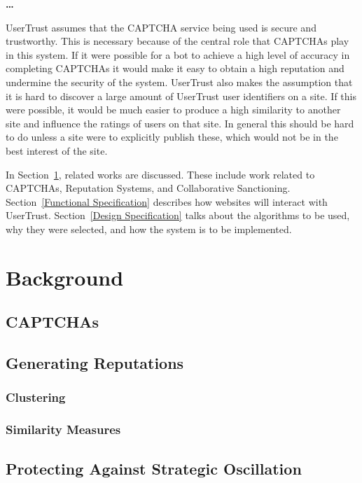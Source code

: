\documentclass[journal, 12pt, onecolumn, draftclsnofoot]{IEEEtran}
\begin{document}
\textbf{\ldots}

UserTrust assumes that the CAPTCHA service being used is secure and trustworthy. This is necessary because of the central role that CAPTCHAs play in this system. If it were possible for a bot to achieve a high level of accuracy in completing CAPTCHAs it would make it easy to obtain a high reputation and undermine the security of the system. UserTrust also makes the assumption that it is hard to discover a large amount of UserTrust user identifiers on a site. If this were possible, it would be much easier to produce a high similarity to another site and influence the ratings of users on that site. In general this should be hard to do unless a site were to explicitly publish these, which would not be in the best interest of the site.

In Section~\ref{Background}, related works are discussed. These include work related to CAPTCHAs, Reputation Systems, and Collaborative Sanctioning. Section~\ref{Functional Specification} describes how websites will interact with UserTrust. Section~\ref{Design Specification} talks about the algorithms to be used, why they were selected, and how the system is to be implemented.

\section{Background}
\label{Background}

\subsection{CAPTCHAs}

\subsection{Generating Reputations}

\subsubsection{Clustering}

\subsubsection{Similarity Measures}

\subsection{Protecting Against Strategic Oscillation}
\end{document}

